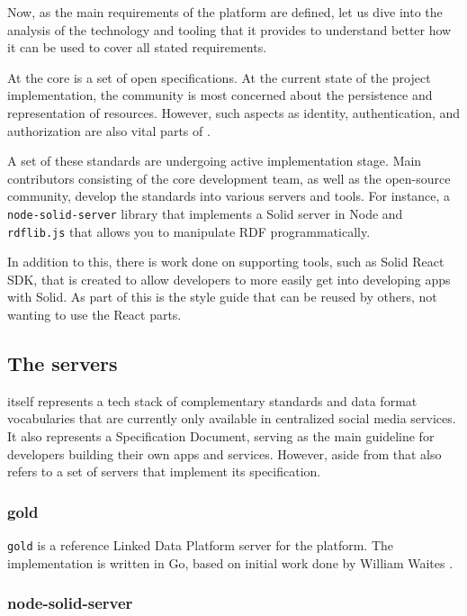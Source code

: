 Now, as the main requirements of the \lpa{} platform are defined, let us dive into the analysis of the \solid{} technology and tooling that it provides to understand better how it can be used to cover all stated requirements.

At the core \solid{} is a set of open specifications. At the current state of the project implementation, the community is most concerned about the persistence and representation of resources. However, such aspects as identity, authentication, and authorization are also vital parts of \solid{}.

A set of these standards are undergoing active implementation stage. Main contributors consisting of the core \solid{} development team, as well as the open-source community, develop the standards into various servers and tools. For instance, a \texttt{node-solid-server} library that implements a Solid server in Node and \texttt{rdflib.js} that allows you to manipulate RDF programmatically.

In addition to this, there is work done on supporting tools, such as Solid React SDK, that is created to allow developers to more easily get into developing apps with Solid. As part of this is the style guide that can be reused by others, not wanting to use the React parts.

\subsection{The \solid{} servers}

\solid{} itself represents a tech stack of complementary standards and data format vocabularies that are currently only available in centralized social media services. It also represents a Specification Document, serving as the main guideline for developers building their own apps and services. However, aside from that \solid{} also refers to a set of servers that implement its specification. 

\subsubsection{gold}

\texttt{gold} is a reference Linked Data Platform server for the \solid{} platform. The implementation is written in Go, based on initial work done by William Waites \cite{solid_gold_server}.

\subsubsection{node-solid-server}

